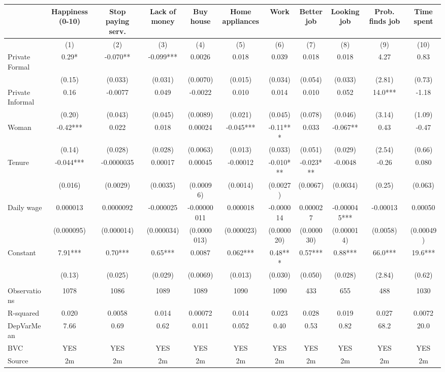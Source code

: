 \begin{tabular}{lcccccccccc}
\toprule
      & Happiness (0-10) & Stop paying serv. & Lack of money & Buy house & Home appliances & Work  & Better job & Looking job & Prob. finds job & Time spent \\
\midrule
\midrule
      & (1)   & (2)   & (3)   & (4)   & (5)   & (6)   & (7)   & (8)   & (9)   & (10) \\
\midrule
\midrule
Private Formal & 0.29* & -0.070** & -0.099*** & 0.0026 & 0.018 & 0.039 & 0.018 & 0.018 & 4.27  & 0.83 \\
      & (0.15) & (0.033) & (0.031) & (0.0070) & (0.015) & (0.034) & (0.054) & (0.033) & (2.81) & (0.73) \\
Private Informal & 0.16  & -0.0077 & 0.049 & -0.0022 & 0.010 & 0.014 & 0.010 & 0.052 & 14.0*** & -1.18 \\
      & (0.20) & (0.043) & (0.045) & (0.0089) & (0.021) & (0.045) & (0.078) & (0.046) & (3.14) & (1.09) \\
Woman & -0.42*** & 0.022 & 0.018 & 0.00024 & -0.045*** & -0.11*** & 0.033 & -0.067** & 0.43  & -0.47 \\
      & (0.14) & (0.028) & (0.028) & (0.0063) & (0.013) & (0.033) & (0.051) & (0.029) & (2.54) & (0.66) \\
Tenure & -0.044*** & -0.0000035 & 0.00017 & 0.00045 & -0.00012 & -0.010*** & -0.023*** & -0.0048 & -0.26 & 0.080 \\
      & (0.016) & (0.0029) & (0.0035) & (0.00096) & (0.0014) & (0.0027) & (0.0067) & (0.0034) & (0.25) & (0.063) \\
Daily wage & 0.000013 & 0.0000092 & -0.000025 & -0.00000011 & 0.000018 & -0.000014 & 0.000027 & -0.000045*** & -0.00013 & 0.00050 \\
      & (0.000095) & (0.000014) & (0.000034) & (0.0000013) & (0.000023) & (0.000020) & (0.000030) & (0.000014) & (0.0058) & (0.00049) \\
Constant & 7.91*** & 0.70*** & 0.65*** & 0.0087 & 0.062*** & 0.48*** & 0.57*** & 0.88*** & 66.0*** & 19.6*** \\
      & (0.13) & (0.025) & (0.029) & (0.0069) & (0.013) & (0.030) & (0.050) & (0.028) & (2.84) & (0.62) \\
      &       &       &       &       &       &       &       &       &       &  \\
\midrule
Observations & 1078  & 1086  & 1089  & 1089  & 1090  & 1090  & 433   & 655   & 488   & 1030 \\
R-squared & 0.020 & 0.0058 & 0.014 & 0.00072 & 0.014 & 0.023 & 0.028 & 0.019 & 0.027 & 0.0072 \\
DepVarMean & 7.66  & 0.69  & 0.62  & 0.011 & 0.052 & 0.40  & 0.53  & 0.82  & 68.2  & 20.0 \\
BVC   & YES   & YES   & YES   & YES   & YES   & YES   & YES   & YES   & YES   & YES \\
Source & 2m    & 2m    & 2m    & 2m    & 2m    & 2m    & 2m    & 2m    & 2m    & 2m \\
\bottomrule
\bottomrule
\end{tabular}%
